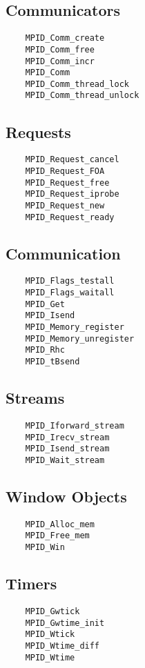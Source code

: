 \documentclass{article}
\begin{document}
\subsection{Communicators}
\begin{verbatim}
    MPID_Comm_create
    MPID_Comm_free
    MPID_Comm_incr
    MPID_Comm
    MPID_Comm_thread_lock
    MPID_Comm_thread_unlock
\end{verbatim}

\subsection{Requests}
\begin{verbatim}
    MPID_Request_cancel
    MPID_Request_FOA
    MPID_Request_free
    MPID_Request_iprobe
    MPID_Request_new
    MPID_Request_ready
\end{verbatim}

\subsection{Communication}
\begin{verbatim}
    MPID_Flags_testall
    MPID_Flags_waitall
    MPID_Get
    MPID_Isend
    MPID_Memory_register
    MPID_Memory_unregister
    MPID_Rhc
    MPID_tBsend
\end{verbatim}

\subsection{Streams}
\begin{verbatim}
    MPID_Iforward_stream
    MPID_Irecv_stream
    MPID_Isend_stream
    MPID_Wait_stream
\end{verbatim}

\subsection{Window Objects}
\begin{verbatim}
    MPID_Alloc_mem
    MPID_Free_mem
    MPID_Win
\end{verbatim}

\subsection{Timers}
\begin{verbatim}
    MPID_Gwtick
    MPID_Gwtime_init
    MPID_Wtick
    MPID_Wtime_diff
    MPID_Wtime
\end{verbatim}
\end{document}
